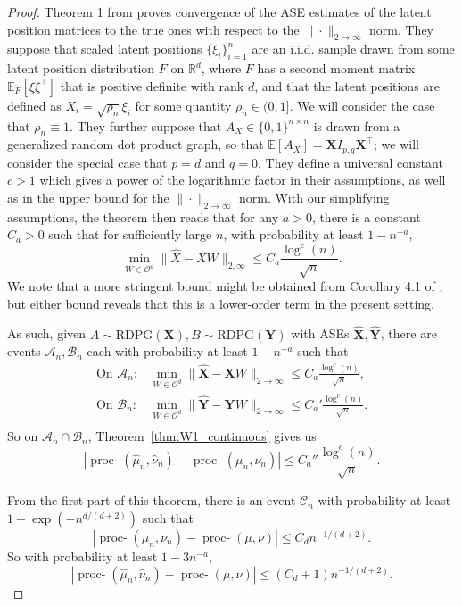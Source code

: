 \documentclass[12pt]{article}
\newcommand{\RR}{\mathbb{R}}
\newcommand{\EE}{\mathbb{E}}
\theoremstyle{definition}
\newcommand{\bX}{\mathbf{X}}
\newcommand{\bY}{\mathbf{Y}}
\newcommand{\procwp}[1][2]{\mathop{\mbox{proc-$W_#1$}}}
\begin{document}
\begin{proof}
Theorem 1 from \cite{rubin2022statistical} proves convergence of the ASE estimates of the latent position matrices to the true ones with respect to the $\|\cdot\|_{2\rightarrow\infty}$ norm. They suppose that scaled latent positions $\{\xi_i\}_{i=1}^n$ are an i.i.d. sample drawn from some latent position distribution $F$ on $\RR^d$, where $F$ has a second moment matrix $\EE_F[\xi\xi^\top]$ that is positive definite with rank $d$, and that the latent positions are defined as $X_i=\sqrt{\rho_n}\xi_i$ for some quantity $\rho_n\in(0,1]$. We will consider the case that $\rho_n\equiv 1$. They further suppose that $A_X\in\{0,1\}^{n\times n}$ is drawn from a generalized random dot product graph, so that $\EE[A_X]= \bX I_{p,q} \bX^\top$; we will consider the special case that $p=d$ and $q=0$. They define a universal constant $c>1$ which gives a power of the logarithmic factor in their assumptions, as well as in the upper bound for the $\|\cdot\|_{2\rightarrow\infty}$ norm. With our simplifying assumptions, the theorem then reads that for any $a>0$, there is a constant $C_a>0$ such that for sufficiently large $n$, with probability at least $1-n^{-a}$,
$$
\min_{W\in\mathcal{O}^d}\|\hat{X}-XW\|_{2,\infty} \leq C_a \frac{\log^c(n)}{\sqrt{n}}.
$$
We note that a more stringent bound might be obtained from Corollary 4.1 of \cite{xie2024entrywise}, but either bound reveals that this is a lower-order term in the present setting.

As such, given $A\sim\mathrm{RDPG}(\bX), B\sim\mathrm{RDPG}(\bY)$ with ASEs $\hat{\bX}, \hat{\bY}$, there are events $\mathcal{A}_n,\mathcal{B}_n$ each with probability at least $1-n^{-a}$ such that
\begin{align*}
\text{On }\mathcal{A}_n: &\min_{W\in\mathcal{O}^d}\|\hat{\bX}-\bX W\|_{2\rightarrow\infty} \leq C_a \frac{\log^c(n)}{\sqrt{n}},\\
\text{On }\mathcal{B}_n: &\min_{W\in\mathcal{O}^d}\|\hat{\bY}-\bY W\|_{2\rightarrow\infty} \leq C_a' \frac{\log^c(n)}{\sqrt{n}}.\\
\end{align*}
So on $\mathcal{A}_n\cap \mathcal{B}_n$, Theorem~\ref{thm:W1_continuous} gives us
$$|\procwp[1](\hat{\mu}_n,\hat{\nu}_n)-\procwp[1](\mu_n,\nu_n)|\leq C_a'' \frac{\log^c(n)}{\sqrt{n}}.$$


From the first part of this theorem, there is an event $\mathcal{C}_n$ with probability at least $1-\exp(-n^{d/(d+2)})$ such that
$$
|\procwp[1](\mu_n,\nu_n)-\procwp[1](\mu,\nu)|\leq C_d n^{-1/(d+2)}.
$$
So with probability at least $1-3n^{-a}$,
$$
|\procwp[1](\hat{\mu}_n,\hat{\nu}_n)-\procwp[1](\mu,\nu)|\leq (C_d+1)n^{-1/(d+2)}.
$$




\end{proof}
\end{document}
